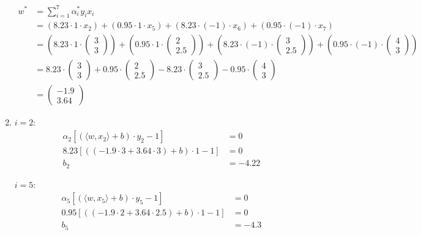 \documentclass[a4paper,12pt]{article}
\begin{document}
\begin{enumerate}
	\begin{align*}
		w^* &= \sum_{i=1}^7 \alpha_i^* y_i x_i \\
			&= (8.23 \cdot 1 \cdot x_2) + (0.95 \cdot 1 \cdot x_5) + (8.23 \cdot (-1) \cdot x_6) + (0.95 \cdot (-1) \cdot x_7) \\
			&= (8.23 \cdot 1 \cdot \begin{pmatrix} 3 \\ 3 \end{pmatrix}) + (0.95 \cdot 1 \cdot \begin{pmatrix} 2 \\ 2.5 \end{pmatrix}) + (8.23 \cdot (-1) \cdot \begin{pmatrix} 3 \\ 2.5 \end{pmatrix}) + (0.95 \cdot (-1) \cdot \begin{pmatrix} 4 \\ 3 \end{pmatrix}) \\
			&= 8.23 \cdot \begin{pmatrix} 3 \\ 3 \end{pmatrix} + 0.95 \cdot \begin{pmatrix} 2 \\ 2.5 \end{pmatrix} - 8.23 \cdot \begin{pmatrix} 3 \\ 2.5 \end{pmatrix} - 0.95 \cdot \begin{pmatrix} 4 \\ 3 \end{pmatrix} \\
			&= \begin{pmatrix} -1.9 \\ 3.64 \end{pmatrix}
	\end{align*}

	\item
	
	$i = 2$:
	\begin{align*}
		\alpha_2 \left[(\langle w, x_2 \rangle + b) \cdot y_2 - 1 \right] &= 0 \\
		8.23 \left[((-1.9 \cdot 3 + 3.64 \cdot 3) + b) \cdot 1 - 1 \right] &= 0 \\
		b_2 &= -4.22
	\end{align*}

	$i = 5$:
	\begin{align*}
		\alpha_5 \left[(\langle w, x_5 \rangle + b) \cdot y_5 - 1 \right] &= 0 \\
		0.95 \left[((-1.9 \cdot 2 + 3.64 \cdot 2.5) + b) \cdot 1 - 1 \right] &= 0 \\
		b_5 &= -4.3
	\end{align*}


\end{enumerate}
\end{document}
